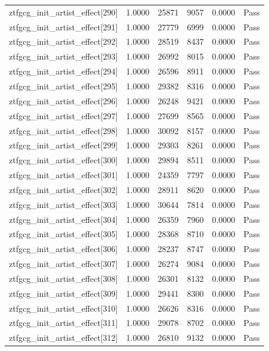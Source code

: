 \begin{table}[htbp]
\begin{tabular}{llrrll}
ztfgcg\_init\_artist\_effect[290] & 1.0000 & 25871 & 9057 & 0.0000 & Pass \\
ztfgcg\_init\_artist\_effect[291] & 1.0000 & 27779 & 6999 & 0.0000 & Pass \\
ztfgcg\_init\_artist\_effect[292] & 1.0000 & 28519 & 8437 & 0.0000 & Pass \\
ztfgcg\_init\_artist\_effect[293] & 1.0000 & 26992 & 8015 & 0.0000 & Pass \\
ztfgcg\_init\_artist\_effect[294] & 1.0000 & 26596 & 8911 & 0.0000 & Pass \\
ztfgcg\_init\_artist\_effect[295] & 1.0000 & 29382 & 8316 & 0.0000 & Pass \\
ztfgcg\_init\_artist\_effect[296] & 1.0000 & 26248 & 9421 & 0.0000 & Pass \\
ztfgcg\_init\_artist\_effect[297] & 1.0000 & 27699 & 8565 & 0.0000 & Pass \\
ztfgcg\_init\_artist\_effect[298] & 1.0000 & 30092 & 8157 & 0.0000 & Pass \\
ztfgcg\_init\_artist\_effect[299] & 1.0000 & 29303 & 8261 & 0.0000 & Pass \\
ztfgcg\_init\_artist\_effect[300] & 1.0000 & 29894 & 8511 & 0.0000 & Pass \\
ztfgcg\_init\_artist\_effect[301] & 1.0000 & 24359 & 7797 & 0.0000 & Pass \\
ztfgcg\_init\_artist\_effect[302] & 1.0000 & 28911 & 8620 & 0.0000 & Pass \\
ztfgcg\_init\_artist\_effect[303] & 1.0000 & 30644 & 7814 & 0.0000 & Pass \\
ztfgcg\_init\_artist\_effect[304] & 1.0000 & 26359 & 7960 & 0.0000 & Pass \\
ztfgcg\_init\_artist\_effect[305] & 1.0000 & 28368 & 8710 & 0.0000 & Pass \\
ztfgcg\_init\_artist\_effect[306] & 1.0000 & 28237 & 8747 & 0.0000 & Pass \\
ztfgcg\_init\_artist\_effect[307] & 1.0000 & 26274 & 9084 & 0.0000 & Pass \\
ztfgcg\_init\_artist\_effect[308] & 1.0000 & 26301 & 8132 & 0.0000 & Pass \\
ztfgcg\_init\_artist\_effect[309] & 1.0000 & 29441 & 8300 & 0.0000 & Pass \\
ztfgcg\_init\_artist\_effect[310] & 1.0000 & 26626 & 8316 & 0.0000 & Pass \\
ztfgcg\_init\_artist\_effect[311] & 1.0000 & 29078 & 8702 & 0.0000 & Pass \\
ztfgcg\_init\_artist\_effect[312] & 1.0000 & 26810 & 9132 & 0.0000 & Pass \\

\end{tabular}
\end{table}
